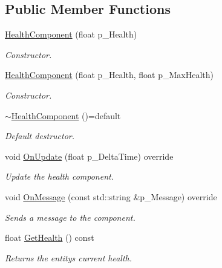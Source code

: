 \subsection*{Public Member Functions}
\begin{DoxyCompactItemize}
\item 
\mbox{\hyperlink{class_health_component_a048219dc6ddcede021b49bb380838aca}{Health\+Component}} (float p\+\_\+\+Health)
\begin{DoxyCompactList}\small\item\em Constructor. \end{DoxyCompactList}\item 
\mbox{\hyperlink{class_health_component_a6b29bbbe02c1217c7c3f40137b2c2967}{Health\+Component}} (float p\+\_\+\+Health, float p\+\_\+\+Max\+Health)
\begin{DoxyCompactList}\small\item\em Constructor. \end{DoxyCompactList}\item 
\mbox{\label{class_health_component_af9881732a6de9899dbb006202e057f1e}} 
\mbox{\hyperlink{class_health_component_af9881732a6de9899dbb006202e057f1e}{$\sim$\+Health\+Component}} ()=default
\begin{DoxyCompactList}\small\item\em Default destructor. \end{DoxyCompactList}\item 
void \mbox{\hyperlink{class_health_component_a525bed56c917ce36bbfb67264350e56a}{On\+Update}} (float p\+\_\+\+Delta\+Time) override
\begin{DoxyCompactList}\small\item\em Update the health component. \end{DoxyCompactList}\item 
void \mbox{\hyperlink{class_health_component_aaaf08f6e3535e5cf0e94bddff815c11f}{On\+Message}} (const std\+::string \&p\+\_\+\+Message) override
\begin{DoxyCompactList}\small\item\em Sends a message to the component. \end{DoxyCompactList}\item 
\mbox{\label{class_health_component_a38f1a3045adefe5f07c5d168b2a4432b}} 
float \mbox{\hyperlink{class_health_component_a38f1a3045adefe5f07c5d168b2a4432b}{Get\+Health}} () const
\begin{DoxyCompactList}\small\item\em Returns the entity\textquotesingle{}s current health. \end{DoxyCompactList}\item 

\end{DoxyCompactItemize}
